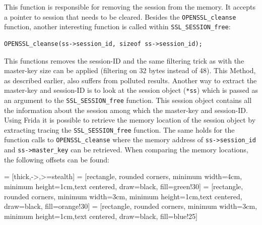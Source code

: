 \documentclass[12pt, a4paper]{report}
\begin{document}
This function is responsible for removing the session from the memory. It accepts a pointer to session that needs to be cleared. Besides the \texttt{OPENSSL\_cleanse} function, another interesting function is called within \texttt{SSL\_SESSION\_free}:

\begin{lstlisting}[frame=single, breaklines=true]
OPENSSL_cleanse(ss->session_id, sizeof ss->session_id);
\end{lstlisting}

This functions removes the session-ID and the same filtering trick as with the master-key size can be applied (filtering on 32 bytes instead of 48). This Method, as described earlier, also suffers from polluted results.
\newline
\newline
\noindent Another way to extract the master-key and session-ID is to look at the session object (\texttt{*ss}) which is passed as an argument to the \texttt{SSL\_SESSION\_free} function. This session object contains all the information about the session among which the master-key and session-ID. Using Frida it is possible to retrieve the memory location of the session object by extracting tracing the \texttt{SSL\_SESSION\_free} function. The same holds for the function calls to \texttt{OPENSSL\_cleanse} where the memory address of \texttt{ss->session\_id} and \texttt{ss->master\_key} can be retrieved. When comparing the memory locations, the following offsets can be found:

 = [thick,->,>=stealth]
 = [rectangle, rounded corners, minimum width=4cm, minimum height=1cm,text centered, draw=black, fill=green!30]
 = [rectangle, rounded corners, minimum width=3cm, minimum height=1cm,text centered, draw=black, fill=orange!30]
 = [rectangle, rounded corners, minimum width=3cm, minimum height=1cm,text centered, draw=black, fill=blue!25]
\end{document}
